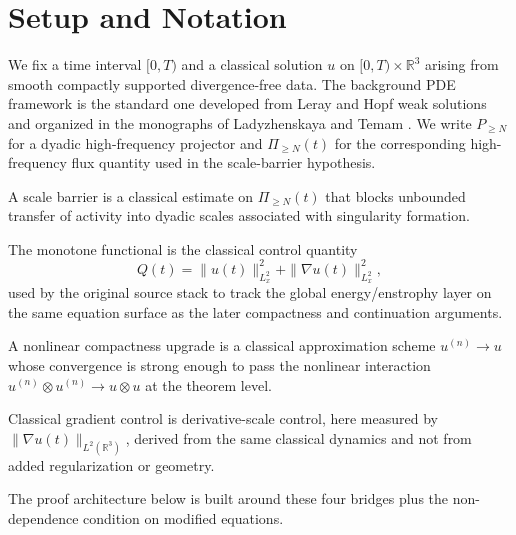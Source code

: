 \section{Setup and Notation}

We fix a time interval \([0,T)\) and a classical solution \(u\) on
\([0,T)\times\mathbb{R}^3\) arising from smooth compactly supported
divergence-free data. The background PDE framework is the standard one
developed from Leray and Hopf weak solutions and organized in the monographs of
Ladyzhenskaya and Temam \cite{Leray1934,Hopf1951,Ladyzhenskaya1969,Temam2001}.
We write \(P_{\ge N}\) for a dyadic high-frequency projector and
\(\Pi_{\ge N}(t)\) for the corresponding high-frequency flux quantity used in
the scale-barrier hypothesis.

\begin{definition}
A scale barrier is a classical estimate on \(\Pi_{\ge N}(t)\) that blocks unbounded transfer of activity into dyadic scales associated with singularity formation.
\end{definition}

\begin{definition}
The monotone functional is the classical control quantity
\[
Q(t)=\|u(t)\|_{L^2_x}^2+\|\nabla u(t)\|_{L^2_x}^2,
\]
used by the original source stack to track the global energy/enstrophy layer on the same equation surface as the later compactness and continuation arguments.
\end{definition}

\begin{definition}
A nonlinear compactness upgrade is a classical approximation scheme \(u^{(n)}\to u\) whose convergence is strong enough to pass the nonlinear interaction \(u^{(n)}\otimes u^{(n)}\to u\otimes u\) at the theorem level.
\end{definition}

\begin{definition}
Classical gradient control is derivative-scale control, here measured by \(\|\nabla u(t)\|_{L^2(\mathbb{R}^3)}\), derived from the same classical dynamics and not from added regularization or geometry.
\end{definition}

The proof architecture below is built around these four bridges plus the non-dependence condition on modified equations.
